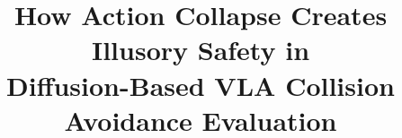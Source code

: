 \documentclass[conference]{IEEEtran}
\title{How Action Collapse Creates Illusory Safety in\\Diffusion-Based VLA Collision Avoidance Evaluation}
\author{\IEEEauthorblockN{Anonymous Authors}}
\begin{document}
\maketitle




















\clearpage
\appendices

\end{document}
